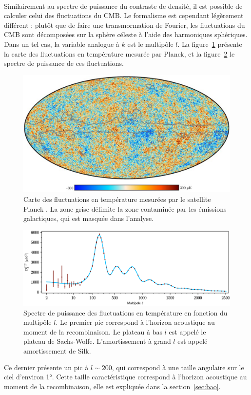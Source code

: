 \paragraph{}
Similairement au spectre de puissance du contraste de densité, il est possible de calculer celui des fluctuations du CMB. Le formalisme est cependant légèrement différent : plutôt que de faire une transmormation de Fourier, les fluctuations du CMB sont décomposées sur la sphère céleste à l'aide des harmoniques sphériques. Dans un tel cas, la variable analogue à $k$ est le multipôle $l$. La figure~\ref{fig:carte_cmb} présente la carte des fluctuations en température mesurée par Planck, et la figure~\ref{fig:spectre_cmb} le spectre de puissance de ces fluctuations.
\begin{figure}
  \centering
  \includegraphics[scale=0.3]{carte_cmb}
  \caption{Carte des fluctuations en température mesurées par le satellite Planck \autocite{Aghanim2019}. La zone grise délimite la zone contaminée par les émissions galactiques, qui est masquée dans l'analyse.}
  \label{fig:carte_cmb}
\end{figure}
\begin{figure}
  \centering
  \includegraphics[scale=0.4]{spectre_cmb}
  \caption{Spectre de puissance des fluctuations en température en fonction du multipôle $l$. Le premier pic correspond à l'horizon acoustique au moment de la recombinaison. Le plateau à bas $l$ est appelé le plateau de Sachs-Wolfe. L'amortissement à grand $l$ est appelé amortissement de Silk.}
  \label{fig:spectre_cmb}
\end{figure}
Ce dernier présente un pic à $l \sim 200$, qui correspond à une taille angulaire sur le ciel d'environ \ang{1}. Cette taille caractéristique correspond à l'horizon acoustique au moment de la recombinaison, elle est expliquée dans la section~\ref{sec:bao}.

